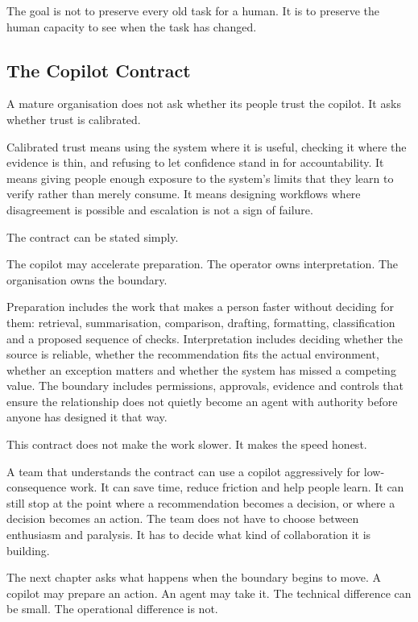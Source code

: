 The goal is not to preserve every old task for a human. It is to
preserve the human capacity to see when the task has changed.

\subsection{The Copilot Contract}\label{the-copilot-contract}

A mature organisation does not ask whether its people trust the copilot.
It asks whether trust is calibrated.

Calibrated trust means using the system where it is useful, checking it
where the evidence is thin, and refusing to let confidence stand in for
accountability. It means giving people enough exposure to the system's
limits that they learn to verify rather than merely consume. It means
designing workflows where disagreement is possible and escalation is not
a sign of failure.

The contract can be stated simply.

The copilot may accelerate preparation. The operator owns
interpretation. The organisation owns the boundary.

Preparation includes the work that makes a person faster without
deciding for them: retrieval, summarisation, comparison, drafting,
formatting, classification and a proposed sequence of checks.
Interpretation includes deciding whether the source is reliable, whether
the recommendation fits the actual environment, whether an exception
matters and whether the system has missed a competing value. The
boundary includes permissions, approvals, evidence and controls that
ensure the relationship does not quietly become an agent with authority
before anyone has designed it that way.

This contract does not make the work slower. It makes the speed honest.

A team that understands the contract can use a copilot aggressively for
low-consequence work. It can save time, reduce friction and help people
learn. It can still stop at the point where a recommendation becomes a
decision, or where a decision becomes an action. The team does not have
to choose between enthusiasm and paralysis. It has to decide what kind
of collaboration it is building.

The next chapter asks what happens when the boundary begins to move. A
copilot may prepare an action. An agent may take it. The technical
difference can be small. The operational difference is not.

